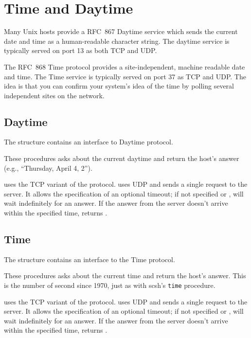 \chapter{Time and Daytime}\label{cha:ntp}

Many Unix hosts provide a RFC~867 Daytime service which sends the
current date and time as a human-readable character string. The
daytime service is typically served on port 13 as both TCP and UDP.

The RFC~868 Time protocol provides a site-independent, machine
readable date and time.  The Time service is typically served
on port 37 as TCP and UDP. The idea is that you can confirm your
system's idea of the time by polling several independent sites on the
network.

\section{Daytime}

The  structure contains an interface to Daytime protocol.

\begin{desc}
  These procedures asks  about the current daytime and
  return the host's answer (e.g., ``Thursday, April 4,
  2'').
  
   uses the TCP variant of the protocol.
   uses UDP and sends a single request to the
  server.  It allows the specification of an optional timeout; if not
  specified or \sharpf{},  will wait
  indefinitely for an answer.  If the answer from the server doesn't
  arrive within the specified time,  returns
  \sharpf.
\end{desc}

\section{Time}

The  structure contains an interface to the Time protocol.

\begin{desc}
  These procedures asks  about the current time and return
  the host's answer.  This is the number of second since 1970, just as
  with scsh's \texttt{time} procedure.

   uses the TCP variant of the protocol.
   uses UDP and sends a single request to the
  server.  It allows the specification of an optional timeout; if not
  specified or \sharpf{},  will wait
  indefinitely for an answer.  If the answer from the server doesn't
  arrive within the specified time,  returns
  \sharpf.
\end{desc}


